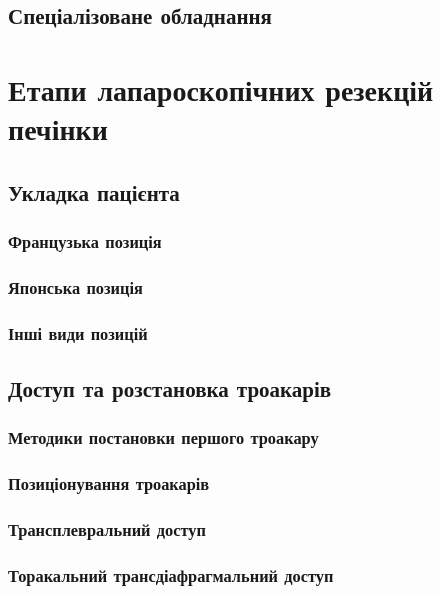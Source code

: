 \begin{refsection}
\subsection{Спеціалізоване обладнання}

\section{Етапи лапароскопічних резекцій печінки}

\subsection{Укладка пацієнта}

\subsubsection{Французька позиція}

\subsubsection{Японська позиція}

\subsubsection{Інші види позицій}

\subsection{Доступ та розстановка троакарів}

\subsubsection{Методики постановки першого троакару}

\subsubsection{Позиціонування троакарів}

\subsubsection{Трансплевральний доступ}

\subsubsection{Торакальний трансдіафрагмальний доступ}


\end{refsection}
